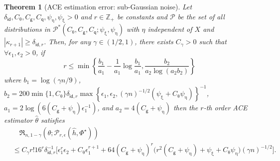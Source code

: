 \documentclass{article}
\def\eps{{\epsilon}}
\def\gP{{\mathcal{P}}}
\newtheorem{theorem}{Theorem}[section]
\begin{document}
\begin{theorem}[ACE estimation error: sub-Gaussian noise]
    \label{thm:arbitrary-order-orthogonal}
    Let $\delta_{\mathsf{id}}, C_{\uptheta}, C_{\mathsf{g}}, C_{\mathsf{q}}, \psi_{\upeta}, \psi_{\upxi} > 0$ and $r\in\mathbb{Z}_+$ be constants and $\gP$ be the set of all distributions in $\gP^*(C_{\uptheta}, C_{\mathsf{g}}, C_{\mathsf{q}}; \psi_{\upxi}, \psi_{\upeta})$ with $\eta$ independent of $X$ and $|\kappa_{r+1}|\geq \delta_{\mathsf{id},r}$.
    Then, for any $\gamma\in(1/2,1)$, there exists $C_{\gamma}>0$ such that $\forall\eps_1,\eps_2>0$, if 
    \begin{equation}
        \label{eq:independent-noise-l-cond}\textstyle
        r \leq \min\left\{ \frac{b_1}{a_1}-\frac{1}{a_1}\log \frac{b_1}{a_1}, \frac{b_2}{a_2\log(a_2b_2)}\right\}
    \end{equation}
    where  $b_1=\log(\gamma n/9)$, $b_2=200 \min\{1,C_{\uptheta}\}\delta_{\mathsf{id},r}\max\left\{\eps_1,\eps_2,(\gamma n)^{-1/2}(\psi_{\upxi}+C_{\uptheta}\psi_{\upeta})\right\}^{-1}$,
    $a_1=2\log(6(C_{\mathsf{g}}+\psi_{\upeta})\eps_1^{-1})$, and $a_2 = 4(C_{\mathsf{g}}+\psi_{\upeta})$ then the $r$-th order ACE estimator $
    \hat\theta$ satisfies
    \begin{equation}
        \label{eq:arbitrary-order-orthogonal}
        \begin{aligned}
            &\quad \mathfrak{R}_{n,1-\gamma} (\hat{\theta};\gP_{r,\eps}(\hat{h},\Phi^{\star})) \\
            &\leq C_{\gamma} r!16^r \delta_{\mathsf{id},r}^{-1}\Big[ \eps_1^{r}\eps_2 + C_{\uptheta}\eps_1^{r+1} + 64(C_{\mathsf{g}}+\psi_{\upeta})^r\big(r^2(C_{\mathsf{g}}+\psi_{\upeta})+\psi_{\upxi}+C_{\uptheta}\psi_{\upeta}\big) (\gamma n)^{-1/2} \Big].
        \end{aligned}
    \end{equation}
\end{theorem}
\end{document}
